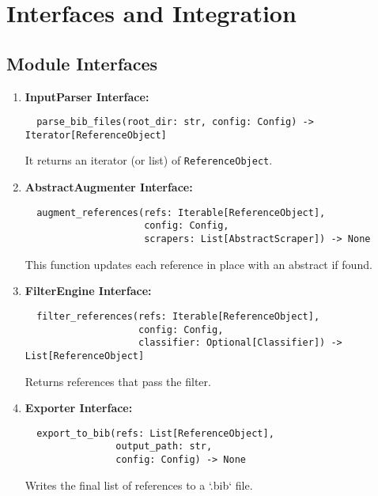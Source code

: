 \documentclass[12pt]{article}
\begin{document}
\section{Interfaces and Integration}

\subsection{Module Interfaces}
\begin{enumerate}
  \item \textbf{InputParser Interface:}
  \begin{verbatim}
  parse_bib_files(root_dir: str, config: Config) -> Iterator[ReferenceObject]
  \end{verbatim}
  It returns an iterator (or list) of \texttt{ReferenceObject}.

  \item \textbf{AbstractAugmenter Interface:}
  \begin{verbatim}
  augment_references(refs: Iterable[ReferenceObject],
                     config: Config,
                     scrapers: List[AbstractScraper]) -> None
  \end{verbatim}
  This function updates each reference in place with an abstract if found.

  \item \textbf{FilterEngine Interface:}
  \begin{verbatim}
  filter_references(refs: Iterable[ReferenceObject],
                    config: Config,
                    classifier: Optional[Classifier]) -> List[ReferenceObject]
  \end{verbatim}
  Returns references that pass the filter.

  \item \textbf{Exporter Interface:}
  \begin{verbatim}
  export_to_bib(refs: List[ReferenceObject],
                output_path: str,
                config: Config) -> None
  \end{verbatim}
  Writes the final list of references to a `.bib` file.
\end{enumerate}
\end{document}
